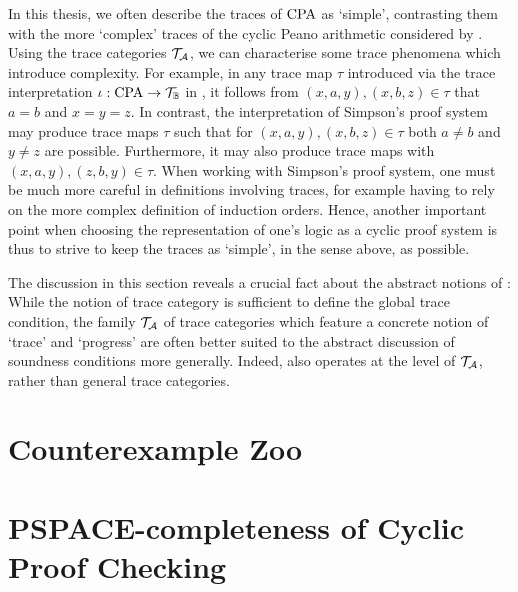 In this thesis, we often describe the traces of $\mathrm{CPA}$ as `simple', contrasting
them with the more `complex' traces of the cyclic Peano arithmetic
considered by \textcite{simpsonCyclicArithmeticEquivalent2017}. Using the trace
categories $\mathcal{T}_{\mathcal{A}}$, we can characterise some trace phenomena which introduce
complexity. For example, in any trace map $\tau$ introduced via the trace
interpretation $\iota : \mathrm{CPA} \to \mathcal{T}_{\mathbb{B}}$ in , it follows
from $(x, a, y), (x, b, z) \in \tau$ that $a = b$ and $x = y = z$. In contrast,
the interpretation of Simpson's proof system may produce trace maps $\tau$ such
that for $(x, a, y), (x, b, z) \in \tau$ both $a \neq b$ and $y \neq z$ are
possible. Furthermore, it may also produce trace maps with $(x, a, y), (z, b, y)
\in \tau$. When working with Simpson's proof system, one must be much more
careful in definitions involving traces, for example having to rely on the more
complex definition of induction orders. Hence, another important point when choosing
the representation of one's logic as a cyclic proof system is thus to strive to
keep the traces as `simple', in the sense above, as possible.

The discussion in this section reveals a crucial fact about the abstract notions
of \textcite{wehrAbstractFrameworkAnalysis2021}: While the notion of trace
category is sufficient to define the global trace condition, the
family $\mathcal{T}_{\mathcal{A}}$ of trace categories which feature a concrete notion of `trace'
and `progress' are often better suited to the abstract discussion of soundness
conditions more generally. Indeed, \papOne{} also operates at the level of
$\mathcal{T}_{\mathcal{A}}$, rather than general trace categories.

\section{Counterexample Zoo}
\label{sec:zoo}

\section{PSPACE-completeness of Cyclic Proof Checking}
\label{sec:pspace}


